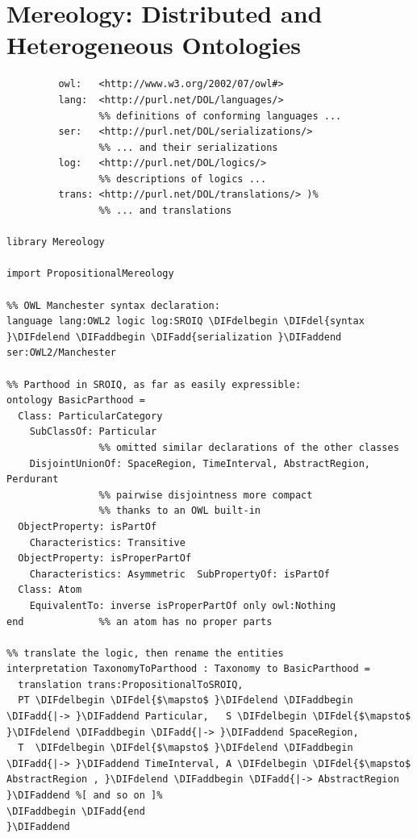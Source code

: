 \documentclass[10pt,fleqn,final]{scrreprt}
\newcommand{\sclause}[1]{\section{#1}}
\providecommand{\DIFadd}[1]{{\protect\color{blue}\uwave{#1}}} %
\providecommand{\DIFdel}[1]{{\protect\color{red}\sout{#1}}}                      %
\providecommand{\DIFaddbegin}{} %
\providecommand{\DIFaddend}{} %
\providecommand{\DIFdelbegin}{} %
\providecommand{\DIFdelend}{} %
\begin{document}
\sclause{Mereology: Distributed and Heterogeneous Ontologies}
\label{dist-het-onto}
\DIFdelbegin %
\DIFdelend \DIFaddbegin \begin{lstlisting}[basicstyle=\ttfamily,language=dolText,alsolanguage=owl2Manchester,alsolanguage=clif,escapechar=@,mathescape]
\DIFaddend %prefix( :      <http://www.example.org/mereology#>
         owl:   <http://www.w3.org/2002/07/owl#>
         lang:  <http://purl.net/DOL/languages/>
                %% definitions of conforming languages ...
         ser:   <http://purl.net/DOL/serializations/>
                %% ... and their serializations
         log:   <http://purl.net/DOL/logics/>
                %% descriptions of logics ...
         trans: <http://purl.net/DOL/translations/> )%
                %% ... and translations

library Mereology

import PropositionalMereology

%% OWL Manchester syntax declaration: 
language lang:OWL2 logic log:SROIQ \DIFdelbegin \DIFdel{syntax }\DIFdelend \DIFaddbegin \DIFadd{serialization }\DIFaddend ser:OWL2/Manchester           

%% Parthood in SROIQ, as far as easily expressible:
ontology BasicParthood =                             
  Class: ParticularCategory 
  	SubClassOf: Particular
                %% omitted similar declarations of the other classes
    DisjointUnionOf: SpaceRegion, TimeInterval, AbstractRegion, Perdurant
                %% pairwise disjointness more compact 
                %% thanks to an OWL built-in
  ObjectProperty: isPartOf        
  	Characteristics: Transitive
  ObjectProperty: isProperPartOf  
  	Characteristics: Asymmetric  SubPropertyOf: isPartOf 
  Class: Atom 
  	EquivalentTo: inverse isProperPartOf only owl:Nothing
end             %% an atom has no proper parts

%% translate the logic, then rename the entities
interpretation TaxonomyToParthood : Taxonomy to BasicParthood =
  translation trans:PropositionalToSROIQ,
  PT \DIFdelbegin \DIFdel{$\mapsto$ }\DIFdelend \DIFaddbegin \DIFadd{|-> }\DIFaddend Particular,   S \DIFdelbegin \DIFdel{$\mapsto$ }\DIFdelend \DIFaddbegin \DIFadd{|-> }\DIFaddend SpaceRegion,
  T  \DIFdelbegin \DIFdel{$\mapsto$ }\DIFdelend \DIFaddbegin \DIFadd{|-> }\DIFaddend TimeInterval, A \DIFdelbegin \DIFdel{$\mapsto$ AbstractRegion , }\DIFdelend \DIFaddbegin \DIFadd{|-> AbstractRegion }\DIFaddend %[ and so on ]%
\DIFaddbegin \DIFadd{end
}\DIFaddend 


\end{lstlisting}
\end{document}
